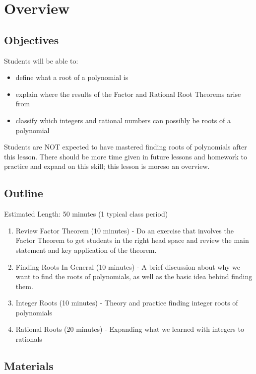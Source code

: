 \section{Overview}

\subsection{Objectives}

Students will be able to:

\begin{itemize}
    \item define what a root of a polynomial is
    \item explain where the results of the Factor and Rational Root Theorems arise from
    \item classify which integers and rational numbers can possibly be roots of a polynomial 
\end{itemize}

Students are NOT expected to have mastered finding roots of polynomials after this lesson. There should be more time given in future lessons and homework to practice and expand on this skill; this lesson is moreso an overview.

\subsection{Outline}

Estimated Length: 50 minutes (1 typical class period)

\begin{enumerate}
    \item Review Factor Theorem (10 minutes) - Do an exercise that involves the Factor Theorem to get students in the right head space and review the main statement and key application of the theorem.
    \item Finding Roots In General (10 minutes) - A brief discussion about why we want to find the roots of polynomials, as well as the basic idea behind finding them.
    \item Integer Roots (10 minutes) - Theory and practice finding integer roots of polynomials
    \item Rational Roots (20 minutes) - Expanding what we learned with integers to rationals
\end{enumerate}

\subsection{Materials}

